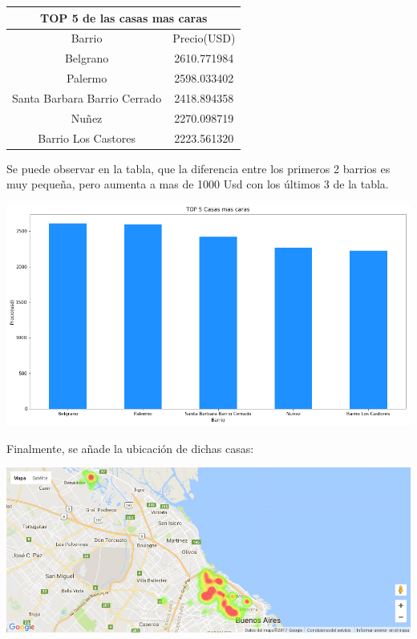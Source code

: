 \documentclass[a4paper, 10pt]{article}
\begin{document}
					\begin{center}
						\begin{tabular}{ |c|c| }
							\hline
							\multicolumn{2}{|c|}{TOP 5 de las casas mas caras}\\
							\hline
							\hline
							Barrio & Precio(USD)\\
							\hline
							 Belgrano & 2610.771984 \\
							 Palermo & 2598.033402 \\
							 Santa Barbara Barrio Cerrado & 2418.894358 \\
							 Nuñez & 2270.098719 \\
							 Barrio Los Castores & 2223.561320 \\
							\hline
						\end{tabular}
					\end{center}
				
				Se puede observar en la tabla, que la diferencia entre los primeros 2 barrios es muy pequeña, pero aumenta a mas de 1000 Usd con los últimos 3 de la tabla.
				
				\begin{center}
   		    				\includegraphics[width=\textwidth]{images/topCc}
				\end{center}
				
				Finalmente, se añade la ubicación de dichas casas:
				
				\begin{center}
   		    				\includegraphics[width=\textwidth]{images/ubicCc}
				\end{center}
 
\end{document}

